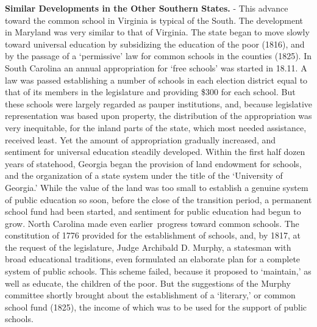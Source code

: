 \documentclass[]{book}
\begin{document}
\textbf{Similar Developments in the Other Southern States.} - This advance toward the common school in Virginia is typical of the South. The development in Maryland was very similar to that of Virginia. The state began to move slowly toward universal education by subsidizing the education of the poor (1816), and by the passage of a `permissive' law for common schools in the counties (1825). In South Carolina an annual appropriation for `free schools' was started in 18.11. A law was passed establishing a number of schools in each election district equal to that of its members in the legislature and providing \$300 for each school. But these schools were largely regarded as pauper institutions, and, because legislative representation was based upon property, the distribution of the appropriation was very inequitable, for the inland parts of the state, which most needed assistance, received least. Yet the amount of appropriation gradually increased, and sentiment for universal education steadily developed. Within the first half dozen years of statehood, Georgia began the provision of land endowment for schools, and the organization of a state system under the title of the `University of Georgia.' While the value of the land was too small to establish a genuine system of public education so soon, before the close of the transition period, a permanent school fund had been started, and sentiment for public education had begun to grow. North Carolina made even earlier~progress toward common schools. The constitution of 1776 provided for the establishment of schools, and, by 1817, at the request of the legislature, Judge Archibald D. Murphy, a statesman with broad educational traditions, even formulated an elaborate plan for a complete system of public schools. This scheme failed, because it proposed to `maintain,' as well as educate, the children of the poor. But the suggestions of the Murphy committee shortly brought about the establishment of a `literary,' or common school fund (1825), the income of which was to be used for the support of public schools.
\end{document}
